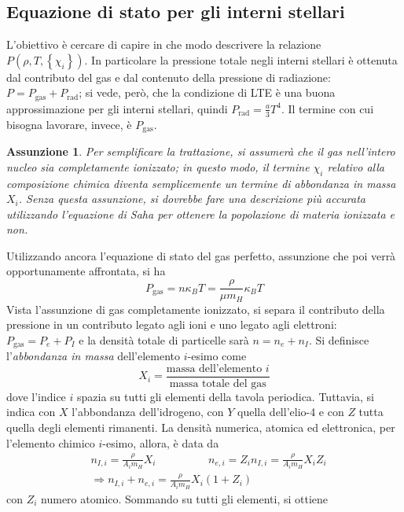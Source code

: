 \documentclass[11pt, a4paper]{scrartcl}
\theoremstyle{style}
\newtheorem{assunzione}{Assunzione}[section]
\theoremstyle{style1}
\numberwithin{equation}{subsection}
\begin{document}
\subsection{Equazione di stato per gli interni stellari}

L'obiettivo \`e cercare di capire in che modo descrivere la relazione $P(\rho ,T, \left\{ \chi _i \right\} )$.
In particolare la pressione totale negli interni stellari \`e ottenuta dal contributo del gas e dal contenuto della pressione di radiazione: $ P = P_\text{gas} + P_\text{rad}$; si vede, per\`o, che la condizione di LTE \`e una buona approssimazione per gli interni stellari, quindi $P_\text{rad} = \frac{a}{3}T^4$.
Il termine con cui bisogna lavorare, invece, \`e $P_\text{gas}$. 
\begin{assunzione}
	Per semplificare la trattazione, si assumer\`a che il gas nell'intero nucleo sia completamente ionizzato; in questo modo, il termine $\chi _i$ relativo alla composizione chimica diventa semplicemente un termine di abbondanza in massa $X_i$.
	Senza questa assunzione, si dovrebbe fare una descrizione pi\`u accurata utilizzando l'equazione di Saha per ottenere la popolazione di materia ionizzata e non.
\end{assunzione}
\noindent Utilizzando ancora l'equazione di stato del gas perfetto, assunzione che poi verr\`a opportunamente affrontata, si ha 
\[
P_\text{gas} = n \kappa _B T = \frac{\rho }{\mu  m_H} \kappa _B T
\] 
Vista l'assunzione di gas completamente ionizzato, si separa il contributo della pressione in un contributo legato agli ioni e uno legato agli elettroni: $P_\text{gas} = P_e + P_I$ e la densit\`a totale di particelle sar\`a $n = n_e + n_I$.
Si definisce l'\textit{abbondanza in massa} dell'elemento $i$-esimo come
\[
X_i = \frac{\text{massa dell'elemento } i }{\text{massa totale del gas}}
\] 
dove l'indice $i$ spazia su tutti gli elementi della tavola periodica.
Tuttavia, si indica con $X$ l'abbondanza dell'idrogeno, con $Y$ quella dell'elio-4 e con $Z$ tutta quella degli elementi rimanenti.
La densit\`a numerica, atomica ed elettronica, per l'elemento chimico $i$-esimo, allora, \`e data da
\[
	\begin{split}
		&n_{I,i}  = \frac{\rho }{A_i m_H} X_i \hspace{2cm} n_{e,i} = Z_in_{I,i}  = \frac{\rho }{A_i m_H} X_i Z_i\\
		&\Rightarrow n_{I,i}  + n_{e,i} = \frac{\rho }{A_i m_H } X_i ( 1 + Z_i)
	\end{split}
\] 
con $Z_i$ numero atomico.
Sommando su tutti gli elementi, si ottiene
\end{document}
